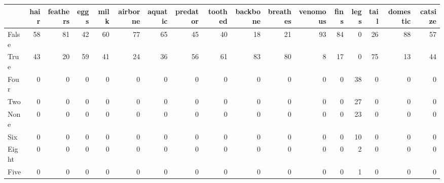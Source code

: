 \begin{tabular}{lrrrrrrrrrrrrrrrr}
\toprule
{} &  hair &  feathers &  eggs &  milk &  airborne &  aquatic &  predator &  toothed &  backbone &  breathes &  venomous &  fins &  legs &  tail &  domestic &  catsize \\
\midrule
False &    58 &        81 &    42 &    60 &        77 &       65 &        45 &       40 &        18 &        21 &        93 &    84 &     0 &    26 &        88 &       57 \\
True  &    43 &        20 &    59 &    41 &        24 &       36 &        56 &       61 &        83 &        80 &         8 &    17 &     0 &    75 &        13 &       44 \\
Four  &     0 &         0 &     0 &     0 &         0 &        0 &         0 &        0 &         0 &         0 &         0 &     0 &    38 &     0 &         0 &        0 \\
Two   &     0 &         0 &     0 &     0 &         0 &        0 &         0 &        0 &         0 &         0 &         0 &     0 &    27 &     0 &         0 &        0 \\
None  &     0 &         0 &     0 &     0 &         0 &        0 &         0 &        0 &         0 &         0 &         0 &     0 &    23 &     0 &         0 &        0 \\
Six   &     0 &         0 &     0 &     0 &         0 &        0 &         0 &        0 &         0 &         0 &         0 &     0 &    10 &     0 &         0 &        0 \\
Eight &     0 &         0 &     0 &     0 &         0 &        0 &         0 &        0 &         0 &         0 &         0 &     0 &     2 &     0 &         0 &        0 \\
Five  &     0 &         0 &     0 &     0 &         0 &        0 &         0 &        0 &         0 &         0 &         0 &     0 &     1 &     0 &         0 &        0 \\
\bottomrule
\end{tabular}
